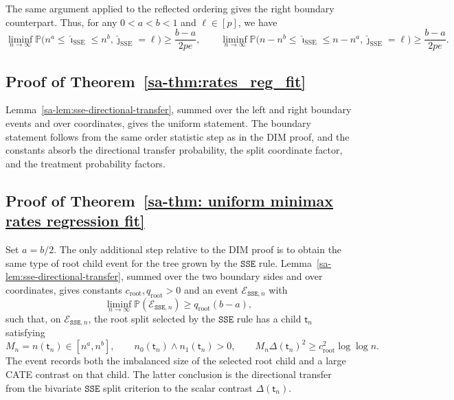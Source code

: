 \documentclass[10pt]{article}
\def\nodet{\mathsf{t}}
\def\P{\mathbb{P}}
\def\SSE{\mathtt{SSE}}
\theoremstyle{definition}
\theoremstyle{remark}
\begin{document}
The same argument applied to the reflected ordering gives the right boundary counterpart. Thus, for any $0 < a < b < 1$ and $\ell \in [p]$, we have
\begin{equation*}
    \liminf_{n\to\infty} \mathbb{P}\big( n^{a} \leq \hat{\imath}_\text{SSE} \leq n^{b}, \hat{\jmath}_\text{SSE} = \ell \big) \geq \frac{b-a}{2pe},
    \qquad
    \liminf_{n\to\infty} \mathbb{P}\big( n-n^{b} \leq \hat{\imath}_\text{SSE} \leq n-n^{a}, \hat{\jmath}_\text{SSE} = \ell \big) \geq \frac{b-a}{2pe}.
\end{equation*}

\subsection{Proof of Theorem~\ref{sa-thm:rates_reg_fit}}

Lemma~\ref{sa-lem:sse-directional-transfer}, summed over the left and right boundary events and over coordinates, gives the uniform statement. The boundary statement follows from the same order statistic step as in the DIM proof, and the constants absorb the directional transfer probability, the split coordinate factor, and the treatment probability factors.

\subsection{Proof of Theorem~\ref{sa-thm: uniform minimax rates regression fit}}

Set $a=b/2$. The only additional step relative to the DIM proof is to obtain
the same type of root child event for the tree grown by the $\SSE$ rule.
Lemma~\ref{sa-lem:sse-directional-transfer}, summed over the two boundary
sides and over coordinates, gives constants $c_{\mathrm{root}},q_{\mathrm{root}}>0$ and an event
$\mathcal E_{\SSE,n}$ with
\[
    \liminf_{n\to\infty}\P(\mathcal E_{\SSE,n})
    \geq
    q_{\mathrm{root}}(b-a),
\]
such that, on $\mathcal E_{\SSE,n}$, the root split selected by the $\SSE$ rule has a child $\nodet_n$ satisfying
\[
    M_n=n(\nodet_n)\in[n^a,n^b],
    \qquad
    n_0(\nodet_n)\wedge n_1(\nodet_n)>0,
    \qquad
    M_n\Delta(\nodet_n)^2
    \geq
    c_{\mathrm{root}}^2\log\log n.
\]
The event records both the imbalanced size of the selected root child and a
large CATE contrast on that child. The latter conclusion is the directional
transfer from the bivariate $\SSE$ split criterion to the scalar contrast
$\Delta(\nodet_n)$.
\end{document}
